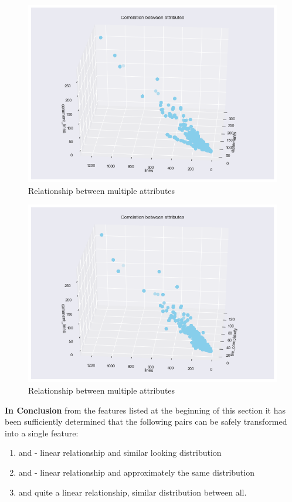 \begin{figure}[!h]
    \centering
    \includegraphics[scale=0.7]{Figures/three-d/Correlation-between-attributes-statements-lines-comment_lines.png}
    \caption{Relationship between multiple attributes}
    \label{fig:3d:statements-lines-commentLines}
\end{figure}

\begin{figure}[!h]
    \centering
    \includegraphics[scale=0.7]{Figures/three-d/Correlation-between-attributes-file_complexity-lines-comment_lines.png}
    \caption{Relationship between multiple attributes}
    \label{fig:3d:fileComplexity-lines-commentLines}
\end{figure}

\FloatBarrier
\textbf{In Conclusion} from the features listed at the beginning of this section it has been sufficiently determined that the following pairs can be safely transformed into a single feature:
\begin{enumerate}
    \item \complexity{} and \fileComplexity{} - linear relationship and similar looking distribution
    \item \statements{} and \linesToCover{} - linear relationship and approximately the same distribution
    \item \lines{} and \ncloc{} quite a linear relationship, similar distribution between all.
\end{enumerate}

